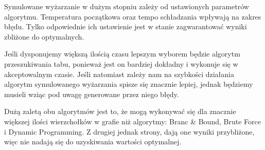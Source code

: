 \documentclass[12pt,a4paper,titlepage]{article}
\begin{document}
Symulowane wyżarzanie w dużym stopniu zależy od ustawionych parametrów algorytmu. Temperatura początkowa oraz tempo schładzania wpływają na zakres błędu. Tylko odpowiednie ich ustawienie jest w stanie zagwarantować wyniki zbliżone do optymalnych.

Jeśli dysponujemy większą ilością czasu lepszym wyborem będzie algorytm przeszukiwania tabu, ponieważ jest on bardziej dokładny i wykonuje się w akceptowalnym czasie. Jeśli natomiast zależy nam na szybkości działania algorytm symulowanego wyżarzania spisze się znacznie lepiej, jednak będziemy musieli wziąc pod uwagę generowane przez niego błędy.

Dużą zaletą obu algorytmów jest to, że mogą wykonywać się dla znacznie większej ilości wierzchołków w grafie niż algorytmy: Branc \& Bound, Brute Force i Dynamic Programming. Z drugiej jednak strony, dają one wyniki przybliżone, więc nie nadają się do uzyskiwania wartości optymalnej.



\end{document}
